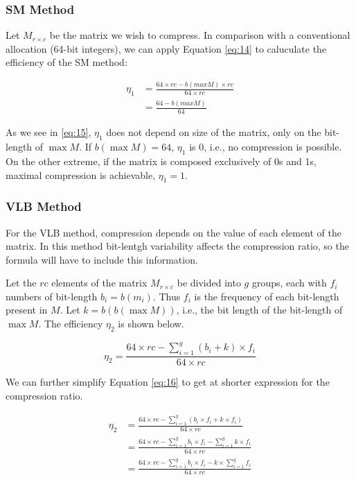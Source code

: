 \documentclass[10pt]{article}
\begin{document}
 \subsubsection*{SM Method}
 Let $M_{r \times c}$ be the matrix we wish to compress. In comparison with a conventional allocation (64-bit integers), we can apply Equation \ref{eq:14} to caluculate the efficiency of the SM method:

\begin{align}\label{eq:15}
 \eta_1 &= \frac{64 \times rc - b(max M) \times rc}{64 \times rc}\nonumber\\
 &= \frac{64  - b(max M) }{64}
\end{align}

As we see in \ref{eq:15}, $\eta_1$ does not depend on size of the matrix, only on the bit-length of $\max M$. If $b(\max M)=64$, $\eta_1$ is 0, i.e., no compression is possible. On the other extreme, if the matrix is composed exclusively of 0s and 1s, maximal compression is achievable, $\eta_1=1$.
 
 \subsubsection*{VLB Method}
 
 For the VLB method, compression depends on the value of each element of the matrix. In this method bit-lentgh variability affects the compression ratio, so the formula will have to include this information.

Let the $rc$ elements of the matrix $M_{r \times c}$ be divided into $g$ groups, each with $f_i$ numbers of bit-length $b_i = b(m_i)$. Thus $f_i$ is the frequency of each bit-length present in $M$. Let $k = b(b(\max M))$, i.e., the bit length of the bit-length of $\max M$. The efficiency $\eta_2$ is shown below.

\begin{equation}\label{eq:16}
 \eta_2 = \frac{64 \times rc - \sum_{i=1}^{g} ( b_i + k ) \times f_i }{64 \times rc} 
\end{equation}

We can further simplify Equation \ref{eq:16} to get at shorter expression for the compression ratio.

\begin{align}
 \eta_2 &= \frac{64 \times rc - \sum_{i=1}^{g} ( b_i \times f_i + k \times f_i )}{64 \times rc} \nonumber \\
  &= \frac{64 \times rc - \sum_{i=1}^{g}  b_i \times f_i  -\sum_{i=1}^{g}  k \times f_i }{64 \times rc}\nonumber \\
  &= \frac{64 \times rc - \sum_{i=1}^{g}  b_i \times f_i  - k \times\sum_{i=1}^{g}  f_i }{64 \times rc}\nonumber 
\end{align}
  
\end{document}
